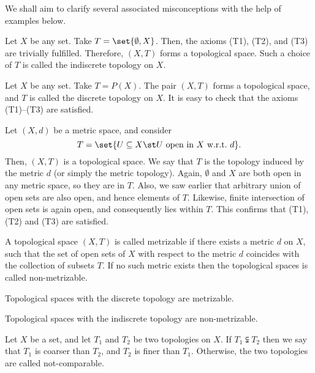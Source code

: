 We shall aim to clarify several associated misconceptions with the help of examples below.
\begin{negg}
  Let $X$ be any set. Take $T = \set{\emptyset, X}$. Then, the axioms (T1), (T2), and (T3) are trivially fulfilled. Therefore, $(X,T)$ forms a topological space. Such a choice of $T$ is called the indiscrete topology on $X$.\eggqed
\end{negg}

\begin{negg}
  Let $X$ be any set. Take $T = P(X)$. The pair $(X,T)$ forms a topological space, and $T$ is called the discrete topology on $X$. It is easy to check that the axioms (T1)--(T3) are satisfied.\eggqed
\end{negg}

\begin{negg}
  Let $(X,d)$ be a metric space, and consider
  \begin{equation*}
    T = \set{U \subseteq X \st U\ \text{open in}\ X\ \text{w.r.t.}\ d}.
  \end{equation*}
  Then, $(X,T)$ is a topological space. We say that $T$ is the topology induced by the metric $d$ (or simply the metric topology). Again, $\emptyset$ and $X$ are both open in any metric space, so they are in $T$. Also, we saw earlier that arbitrary union of open sets are also open, and hence elements of $T$. Likewise, finite intersection of open sets is again open, and consequently lies within $T$. This confirms that (T1), (T2) and (T3) are satisfied.\eggqed
\end{negg}

\begin{ndfn}[Metrizable]
  A topological space $(X,T)$ is called metrizable if there exists a metric $d$ on $X$, such that the set of open sets of $X$ with respect to the metric $d$ coincides with the collection of subsets $T$. If no such metric exists then the topological spaces is called non-metrizable.
\end{ndfn}

\begin{nprop}
  Topological spaces with the discrete topology are metrizable.
\end{nprop}

\begin{nprop}
  Topological spaces with the indiscrete topology are non-metrizable.
\end{nprop}

\begin{ndfn}
  Let $X$ be a set, and let $T_1$ and $T_2$ be two topologies on $X$. If $T_1 \subsetneqq T_2$ then we say that $T_1$ is coarser than $T_2$, and $T_2$ is finer than $T_1$. Otherwise, the two topologies are called not-comparable.
\end{ndfn}

